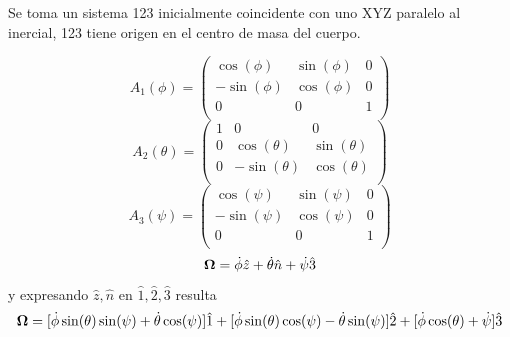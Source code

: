 \documentclass[10pt,oneside]{CBFT_book}
\begin{document}
Se toma un sistema 123 inicialmente coincidente con uno XYZ paralelo al inercial, 123 tiene origen
en el centro de masa del cuerpo.

\[
	A_1(\phi) = 
	\begin{pmatrix}
		\cos(\phi) & \sin(\phi) & 0 \\
		-\sin(\phi) & \cos(\phi) & 0 \\ 
		0 & 0 & 1  \\
	\end{pmatrix}
\]
\[
	A_2(\theta) = 
	\begin{pmatrix}
		1 & 0 & 0 \\
		0 & \cos(\theta) & \sin(\theta) \\ 
		0 & -\sin(\theta) & \cos(\theta)  \\
	\end{pmatrix}
\]
\[
	A_3(\psi) = 
	\begin{pmatrix}
		\cos(\psi) & \sin(\psi) & 0 \\
		-\sin(\psi) & \cos(\psi) & 0 \\ 
		0 & 0 & 1  \\
	\end{pmatrix}
\]
\[
	\vb{\Omega} = \dot{\phi}\hat{z} + \dot{\theta}\hat{n} + \dot{\psi}\hat{3}
\]
y expresando $\hat{z},\hat{n}$ en $\hat{1},\hat{2}, \hat{3}$ resulta
\[
	\vb{\Omega} = [\dot{\phi}\sin(\theta)\sin(\psi) + \dot{\theta}\cos(\psi) ]\hat{1} +
			[\dot{\phi}\sin(\theta)\cos(\psi) - \dot{\theta}\sin(\psi) ] \hat{2} +
			[\dot{\phi}\cos(\theta) + \dot{\psi} ]\hat{3}
\]
\end{document}
